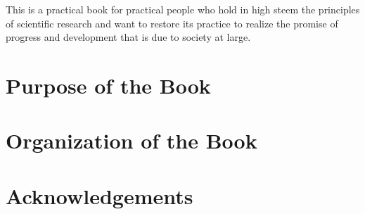 This is a practical book for practical people who hold in high steem the
principles of scientific research and want to restore its practice to
realize the promise of progress and development that is due to society at large.



\section{Purpose of the Book}

\section{Organization of the Book}

\section{Acknowledgements}


